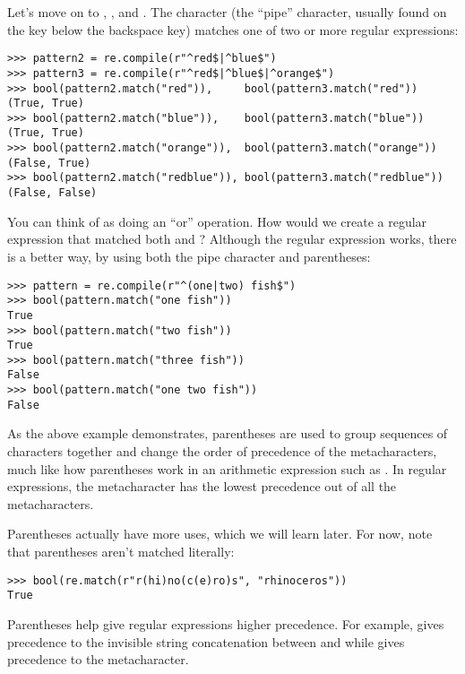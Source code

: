 Let's move on to , , and .
The  character (the ``pipe'' character, usually found on the key below the backspace key) matches one of two or more regular expressions:
\begin{lstlisting}
>>> pattern2 = re.compile(r"^red$|^blue$")
>>> pattern3 = re.compile(r"^red$|^blue$|^orange$")
>>> bool(pattern2.match("red")),     bool(pattern3.match("red"))
(True, True)
>>> bool(pattern2.match("blue")),    bool(pattern3.match("blue"))
(True, True)
>>> bool(pattern2.match("orange")),  bool(pattern3.match("orange"))
(False, True)
>>> bool(pattern2.match("redblue")), bool(pattern3.match("redblue"))
(False, False)
\end{lstlisting}

You can think of  as doing an ``or'' operation.
How would we create a regular expression that matched both  and ?
Although the regular expression  works, there is a better way, by using both the pipe character and parentheses:
\begin{lstlisting}
>>> pattern = re.compile(r"^(one|two) fish$")
>>> bool(pattern.match("one fish"))
True
>>> bool(pattern.match("two fish"))
True
>>> bool(pattern.match("three fish"))
False
>>> bool(pattern.match("one two fish"))
False
\end{lstlisting}
As the above example demonstrates, parentheses are used to group sequences of characters together and change the order of precedence of the metacharacters, much like how parentheses work in an arithmetic expression such as . In regular expressions, the  metacharacter has the lowest precedence out of all the metacharacters.

Parentheses actually have more uses, which we will learn later.
For now, note that parentheses aren't matched literally:
\begin{lstlisting}
>>> bool(re.match(r"r(hi)no(c(e)ro)s", "rhinoceros"))
True
\end{lstlisting}

Parentheses help give regular expressions higher precedence.
For example,  gives precedence to the invisible string concatenation between  and  while  gives precedence to the  metacharacter.

